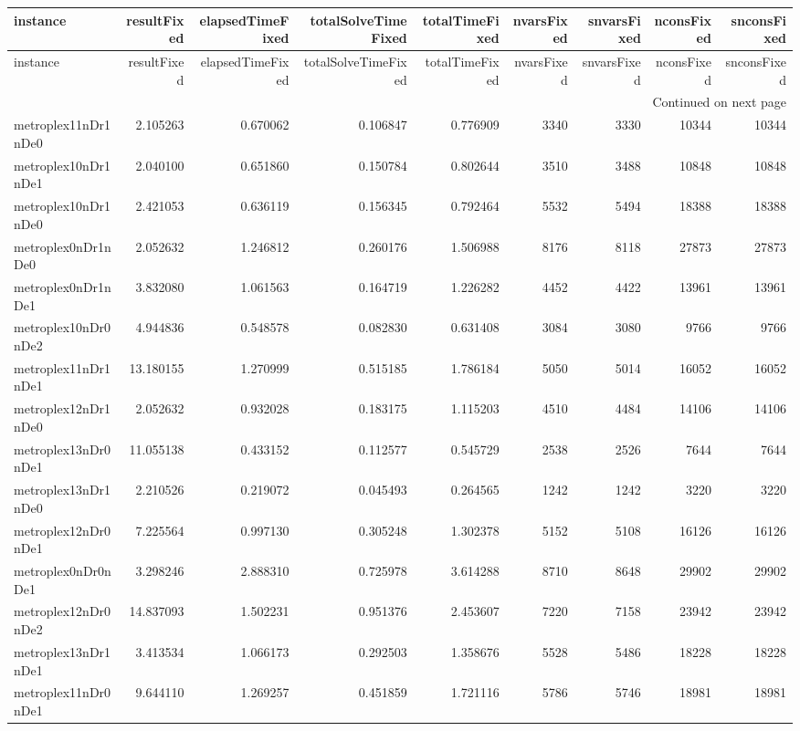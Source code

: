 \begin{longtable}{|l|r|r|r|r|r|r|r|r|}
\toprule
instance & resultFixed & elapsedTimeFixed & totalSolveTimeFixed & totalTimeFixed & nvarsFixed & snvarsFixed & nconsFixed & snconsFixed \\
\midrule
\endfirsthead
\toprule
instance & resultFixed & elapsedTimeFixed & totalSolveTimeFixed & totalTimeFixed & nvarsFixed & snvarsFixed & nconsFixed & snconsFixed \\
\midrule
\endhead
\midrule
\multicolumn{9}{r}{Continued on next page} \\
\midrule
\endfoot
\bottomrule
\endlastfoot
metroplex11nDr1nDe0 & 2.105263 & 0.670062 & 0.106847 & 0.776909 & 3340 & 3330 & 10344 & 10344 \\
metroplex10nDr1nDe1 & 2.040100 & 0.651860 & 0.150784 & 0.802644 & 3510 & 3488 & 10848 & 10848 \\
metroplex10nDr1nDe0 & 2.421053 & 0.636119 & 0.156345 & 0.792464 & 5532 & 5494 & 18388 & 18388 \\
metroplex0nDr1nDe0 & 2.052632 & 1.246812 & 0.260176 & 1.506988 & 8176 & 8118 & 27873 & 27873 \\
metroplex0nDr1nDe1 & 3.832080 & 1.061563 & 0.164719 & 1.226282 & 4452 & 4422 & 13961 & 13961 \\
metroplex10nDr0nDe2 & 4.944836 & 0.548578 & 0.082830 & 0.631408 & 3084 & 3080 & 9766 & 9766 \\
metroplex11nDr1nDe1 & 13.180155 & 1.270999 & 0.515185 & 1.786184 & 5050 & 5014 & 16052 & 16052 \\
metroplex12nDr1nDe0 & 2.052632 & 0.932028 & 0.183175 & 1.115203 & 4510 & 4484 & 14106 & 14106 \\
metroplex13nDr0nDe1 & 11.055138 & 0.433152 & 0.112577 & 0.545729 & 2538 & 2526 & 7644 & 7644 \\
metroplex13nDr1nDe0 & 2.210526 & 0.219072 & 0.045493 & 0.264565 & 1242 & 1242 & 3220 & 3220 \\
metroplex12nDr0nDe1 & 7.225564 & 0.997130 & 0.305248 & 1.302378 & 5152 & 5108 & 16126 & 16126 \\
metroplex0nDr0nDe1 & 3.298246 & 2.888310 & 0.725978 & 3.614288 & 8710 & 8648 & 29902 & 29902 \\
metroplex12nDr0nDe2 & 14.837093 & 1.502231 & 0.951376 & 2.453607 & 7220 & 7158 & 23942 & 23942 \\
metroplex13nDr1nDe1 & 3.413534 & 1.066173 & 0.292503 & 1.358676 & 5528 & 5486 & 18228 & 18228 \\
metroplex11nDr0nDe1 & 9.644110 & 1.269257 & 0.451859 & 1.721116 & 5786 & 5746 & 18981 & 18981 \\

\end{longtable}
